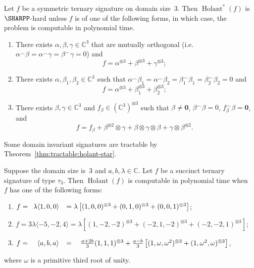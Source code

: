 \documentclass[11pt]{article}
\newcommand{\Holant}{\operatorname{Holant}}
\begin{document}
\begin{theorem} \label{thm:tractable:holant-star}
 Let $f$ be a symmetric ternary signature on domain size~$3$.
 Then $\Holant^*(f)$ is $\SHARPP$-hard unless $f$ is of one of the following forms,
 in which case, the problem is computable in polynomial time.
 \begin{enumerate}
  \item There exists $\alpha, \beta, \gamma \in \mathbb{C}^3$ that are mutually orthogonal
  (i.e.~$\alpha ^\frown \beta = \alpha ^\frown \gamma = \beta ^\frown \gamma = 0$)
  and \[f = \alpha^{\otimes 3} + \beta^{\otimes 3} + \gamma^{\otimes 3};\]
  \item There exists $\alpha, \beta_1, \beta_2 \in \mathbb{C}^3$
  such that $\alpha ^\frown \beta_1 = \alpha ^\frown \beta_2 = \beta_1 ^\frown \beta_1 = \beta_2 ^\frown \beta_2 = 0$ and
  \[f = \alpha^{\otimes 3} + \beta_1^{\otimes 3} + \beta_2^{\otimes 3};\]
  \item There exists $\beta, \gamma \in \mathbb{C}^3$ and $f_\beta \in (\mathbb{C}^{3})^{\otimes 3}$
  such that $\beta \ne \mathbf{0}$, $\beta ^\frown \beta = 0$, $f_\beta ^\frown \beta = \mathbf{0}$,
  and \[f = f_\beta + \beta^{\otimes 2} \otimes \gamma + \beta \otimes \gamma \otimes \beta + \gamma \otimes \beta^{\otimes 2}.\]
 \end{enumerate}
\end{theorem}

Some domain invariant signatures are tractable by Theorem~\ref{thm:tractable:holant-star}.

\begin{corollary} \label{cor:tractable:holant-star}
 Suppose the domain size is~$3$ and $a,b,\lambda \in \mathbb{C}$.
 Let $f$ be a succinct ternary signature of type $\tau_3$.
 Then $\Holant(f)$ is computable in polynomial time when $f$ has one of the following forms:
 \begin{enumerate}
  \item $f = \hphantom{3} \lambda \langle 1, 0,  0 \rangle \hphantom{-}
  = \lambda \left[(1,0, 0)^{\otimes 3} + (0, 1,0)^{\otimes 3} + ( 0,0,1)^{\otimes 3}\right]$; \label{case:cor:tractable:holant-star:equality}
  \item $f =           3  \lambda \langle -5, -2, 4 \rangle
  = \lambda \left[(1,-2,-2)^{\otimes 3} + (-2,1,-2)^{\otimes 3} + (-2,-2,1)^{\otimes 3}\right]$; \label{case:cor:tractable:holant-star:-5-24}
  \item $f = \hphantom{3 \lambda} \langle a, b,  a \rangle \hphantom{-}
  = \hphantom{\lambda \big[}\frac{a + 2 b}{3}  (1,1, 1)^{\otimes 3} + \frac{a - b}{3} \left[(1, \omega, \omega^2)^{\otimes 3} + (1, \omega^2, \omega)^{\otimes 3}\right]$, \label{case:cor:tractable:holant-star:aba}
 \end{enumerate}
 where $\omega$ is a primitive third root of unity.
\end{corollary}
\end{document}
